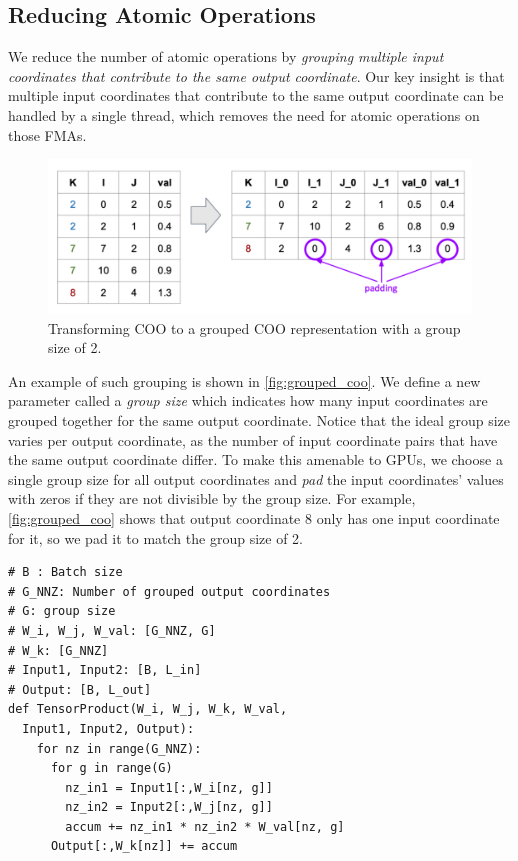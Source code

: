 \subsection{Reducing Atomic Operations}
\label{sec:impl:block}

We reduce the number of atomic operations by \textit{grouping multiple input coordinates that contribute to the same output coordinate}.
Our key insight is that multiple input coordinates that contribute to the same output coordinate can be handled by a single thread,
which removes the need for atomic operations on those FMAs.

\begin{figure}
  \centering
  \includegraphics[width=1.0\linewidth]{grouped_coo.pdf}
  \caption{Transforming COO to a grouped COO representation with a group size of 2.}
  \label{fig:grouped_coo}
\end{figure}

An example of such grouping is shown in \autoref{fig:grouped_coo}.
We define a new parameter called a \textit{group size} which indicates how many input coordinates are grouped together for the same output coordinate.
Notice that the ideal group size varies per output coordinate,
as the number of input coordinate pairs that have the same output coordinate differ.
To make this amenable to GPUs,
we choose a single group size for all output coordinates and \textit{pad} the input coordinates'
values with zeros if they are not divisible by the group size.
For example, \autoref{fig:grouped_coo} shows that output coordinate 8 only has one input coordinate for it,
so we pad it to match the group size of 2.

\begin{lstlisting}[caption={Hash table lookup code.}, label={lst:improved_tensor_prod}, style=custompython]
# B : Batch size
# G_NNZ: Number of grouped output coordinates
# G: group size
# W_i, W_j, W_val: [G_NNZ, G]
# W_k: [G_NNZ]
# Input1, Input2: [B, L_in]
# Output: [B, L_out]
def TensorProduct(W_i, W_j, W_k, W_val, 
  Input1, Input2, Output):
    for nz in range(G_NNZ):
      for g in range(G)
        nz_in1 = Input1[:,W_i[nz, g]]
        nz_in2 = Input2[:,W_j[nz, g]]
        accum += nz_in1 * nz_in2 * W_val[nz, g]
      Output[:,W_k[nz]] += accum
\end{lstlisting}


